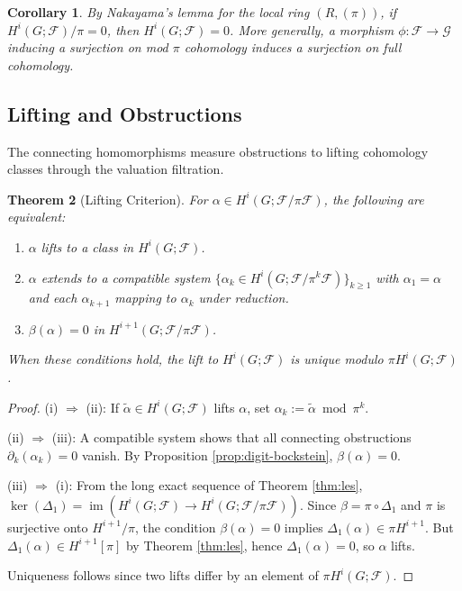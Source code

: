 \documentclass[11pt]{amsart}
\theoremstyle{plain}
\newtheorem{theorem}{Theorem}[section]
\newtheorem{corollary}[theorem]{Corollary}
\theoremstyle{definition}
\newcommand{\Ring}{R}                          %
\newcommand{\unif}{\pi}                        %
\newcommand{\sheaf}[1]{\mathcal{#1}}                  %
\newcommand{\Bock}{\beta}            %
\newcommand{\Conn}[1]{\Delta_{#1}}   %
\newcommand{\Digit}[1]{\partial_{#1}}%
\DeclareMathOperator{\im}{im}                         %
\begin{document}
\begin{corollary}
By Nakayama's lemma for the local ring $(\Ring,(\unif))$, if $H^i(G;\sheaf{F})/\unif = 0$, then $H^i(G;\sheaf{F}) = 0$. More generally, a morphism $\phi:\sheaf{F}\to\sheaf{G}$ inducing a surjection on mod $\unif$ cohomology induces a surjection on full cohomology.
\end{corollary}

\subsection{Lifting and Obstructions}
\label{ssec:lifting}

The connecting homomorphisms measure obstructions to lifting cohomology classes 
through the valuation filtration.

\begin{theorem}[Lifting Criterion]
\label{thm:lifting}
For $\alpha \in H^i(G; \sheaf{F}/\unif\sheaf{F})$, the following are equivalent:
\begin{enumerate}[label=\textup{(\roman*)}]
\item $\alpha$ lifts to a class in $H^i(G; \sheaf{F})$.
\item $\alpha$ extends to a compatible system $\{\alpha_k \in H^i(G; \sheaf{F}/\unif^k\sheaf{F})\}_{k \geq 1}$ 
with $\alpha_1 = \alpha$ and each $\alpha_{k+1}$ mapping to $\alpha_k$ under reduction.
\item $\Bock(\alpha) = 0$ in $H^{i+1}(G; \sheaf{F}/\unif\sheaf{F})$.
\end{enumerate}
When these conditions hold, the lift to $H^i(G; \sheaf{F})$ is unique modulo 
$\unif H^i(G; \sheaf{F})$.
\end{theorem}

\begin{proof}
(i) $\Rightarrow$ (ii): If $\tilde{\alpha} \in H^i(G; \sheaf{F})$ lifts $\alpha$, 
set $\alpha_k := \tilde{\alpha} \bmod \unif^k$.

(ii) $\Rightarrow$ (iii): A compatible system shows that all connecting obstructions 
$\Digit{k}(\alpha_k) = 0$ vanish. By Proposition \ref{prop:digit-bockstein}, 
$\Bock(\alpha) = 0$.

(iii) $\Rightarrow$ (i): From the long exact sequence of Theorem \ref{thm:les}, 
$\ker(\Conn{1}) = \im(H^i(G; \sheaf{F}) \to H^i(G; \sheaf{F}/\unif\sheaf{F}))$. 
Since $\Bock = \pi \circ \Conn{1}$ and $\pi$ is surjective onto $H^{i+1}/\unif$, 
the condition $\Bock(\alpha) = 0$ implies $\Conn{1}(\alpha) \in \unif H^{i+1}$. 
But $\Conn{1}(\alpha) \in H^{i+1}[\unif]$ by Theorem \ref{thm:les}, hence 
$\Conn{1}(\alpha) = 0$, so $\alpha$ lifts.

Uniqueness follows since two lifts differ by an element of $\unif H^i(G; \sheaf{F})$.
\end{proof}
\end{document}
